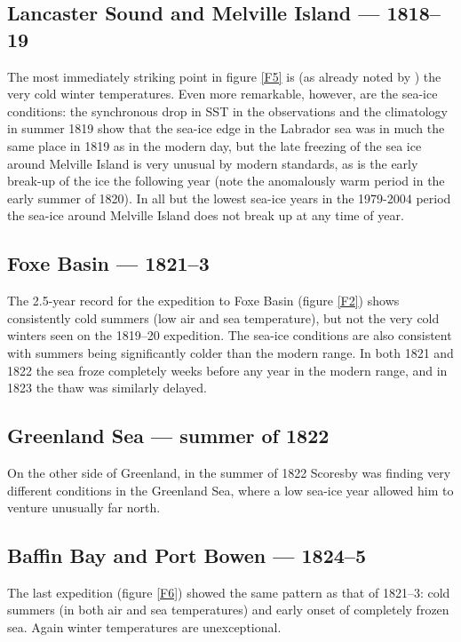 \documentclass[CP]{copernicus}
\begin{document}
\subsection{Lancaster Sound and Melville Island --- 1818--19}

The most immediately striking point in figure \ref{F5} is (as already noted by \citet{przybylak05Arctic}) the very cold winter temperatures. Even more remarkable, however, are the sea-ice conditions: the synchronous drop in SST in the observations and the climatology in summer 1819 show that the sea-ice edge in the Labrador sea was in much the same place in 1819 as in the modern day, but the late freezing of the sea ice around Melville Island is very unusual by modern standards, as is the early break-up of the ice the following year (note the anomalously warm period in the early summer of 1820). In all but the lowest sea-ice years in the 1979-2004 period the sea-ice around Melville Island does not break up at any time of year. 

\subsection{Foxe Basin --- 1821--3}

The 2.5-year record for the expedition to Foxe Basin (figure \ref{F2}) shows consistently cold summers (low air and sea temperature), but not the very cold winters seen on the 1819--20 expedition. The sea-ice conditions are also consistent with summers being significantly colder than the modern range. In both 1821 and 1822 the sea froze completely weeks before any year in the modern range, and in 1823 the thaw was similarly delayed.

\subsection{Greenland Sea --- summer of 1822}

On the other side of Greenland, in the summer of 1822 Scoresby was finding very different conditions in the Greenland Sea, where a low sea-ice year allowed him to venture unusually far north.

\subsection{Baffin Bay and Port Bowen --- 1824--5}

The last expedition (figure \ref{F6}) showed the same pattern as that of 1821--3: cold summers (in both air and sea temperatures) and early onset of completely frozen sea. Again winter temperatures are unexceptional.
\end{document}
